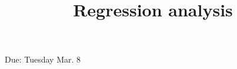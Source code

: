 \documentclass[a4, 12pt]{article}
\title{Regression analysis}
\author{}
\date{}
\begin{document}
\maketitle

Due: Tuesday Mar. 8
\end{document}
